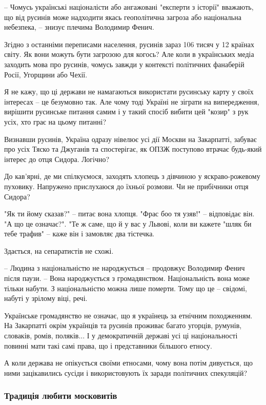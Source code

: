 – Чомусь українські націоналісти або ангажовані "експерти з історії" вважають,
що від русинів може надходити якась геополітична загроза або національна
небезпека, – знизує плечима Володимир Фенич.

Згідно з останніми переписами населення, русинів зараз 106 тисяч у 12 країнах
світу. Як вони можуть бути загрозою для когось? Але коли в українських медіа
заходить мова про русинів, чомусь завжди у контексті політичних фанаберій
Росії, Угорщини або Чехії.

Я не кажу, що ці держави не намагаються використати русинську карту у своїх
інтересах – це безумовно так. Але чому тоді Україні не зіграти на випередження,
вирішити русинське питання самим і у такий спосіб вибити цей "козир" з рук
усіх, хто грає на цьому питанні?

Визнавши русинів, Україна одразу нівелює усі дії Москви на Закарпатті, забуває
про усіх Тяско та Джуганів та спостерігає, як ОПЗЖ поступово втрачає будь-який
інтерес до отця Сидора. Логічно?

До кав’ярні, де ми спілкуємося, заходять хлопець з дівчиною у яскраво-рожевому
пуховику. Напружено прислухаюся до їхньої розмови. Чи не прибічники отця
Сидора?

"Як ти йому сказав?" – питає вона хлопця. "Фрас боо тя узяв!" – відповідає він.
"А що це означає?". "Те ж саме, що й у вас у Львові, коли ви кажете "шляк би
тебе трафив" – каже він і замовляє два тістечка.

Здається, на сепаратистів не схожі. 

– Людина з національністю не народжується – продовжує Володимир Фенич після
паузи. – Вона народжується з громадянством. Національність вона може тільки
набути. З національністю можна лише померти. Тому що це – свідомі, набуті у
зрілому віці, речі.

Українське громадянство не означає, що я українець за етнічним походженням. На
Закарпатті окрім українців та русинів проживає багато угорців, румунів,
словаків, ромів, поляків... І у демократичній державі усі ці національності
повинні мати такі самі права, що і представники більшого етносу.

А коли держава не опікується своїми етносами, чому вона потім дивується, що
ними зацікавились сусіди і використовують їх заради політичних спекуляцій?

\subsubsection{Традиція любити московитів}

